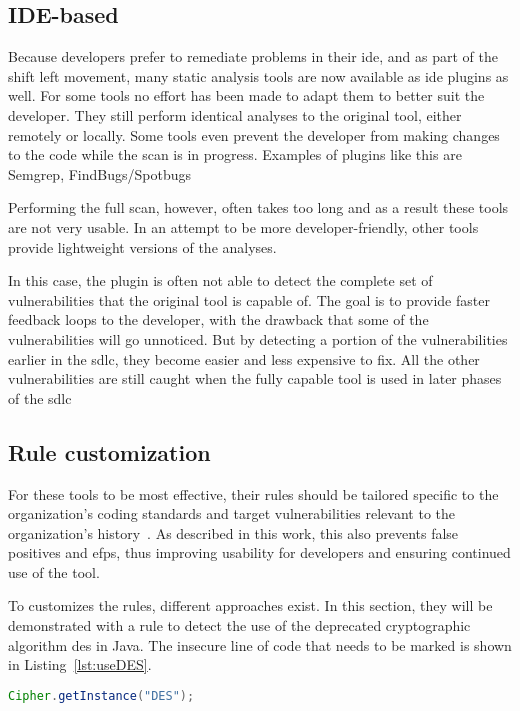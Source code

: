 \subsection{IDE-based}
Because developers prefer to remediate problems in their \gls{ide}, and as part of the shift left movement, many static analysis tools are now available as \gls{ide} plugins as well.
For some tools no effort has been made to adapt them to better suit the developer.
They still perform identical analyses to the original tool, either remotely or locally.
Some tools even prevent the developer from making changes to the code while the scan is in progress.
Examples of plugins like this are Semgrep, FindBugs/Spotbugs

Performing the full scan, however, often takes too long and as a result these tools are not very usable.
In an attempt to be more developer-friendly, other tools provide lightweight versions of the analyses.

In this case, the plugin is often not able to detect the complete set of vulnerabilities that the original tool is capable of.
The goal is to provide faster feedback loops to the developer, with the drawback that some of the vulnerabilities will go unnoticed.
But by detecting a portion of the vulnerabilities earlier in the \gls{sdlc}, they become easier and less expensive to fix.
All the other vulnerabilities are still caught when the fully capable tool is used in later phases of the \gls{sdlc}

\subsection{Rule customization}
For these tools to be most effective, their rules should be tailored specific to the organization's coding standards and target vulnerabilities relevant to the organization's history~\cite{bsimm9,bsimm11}.
As described in this work, this also prevents false positives and \glspl{efp}, thus improving usability for developers and ensuring continued use of the tool.

To customizes the rules, different approaches exist.
In this section, they will be demonstrated with a rule to detect the use of the deprecated cryptographic algorithm \gls{des} in Java.
The insecure line of code that needs to be marked is shown in Listing~\ref{lst:useDES}.

\begin{lstlisting}[language={Java},caption={Insecure use of a deprecated cryptographic algorithm},label={lst:useDES},abovecaptionskip=-0.0pt,xleftmargin=15pt]
Cipher.getInstance("DES");
\end{lstlisting}

